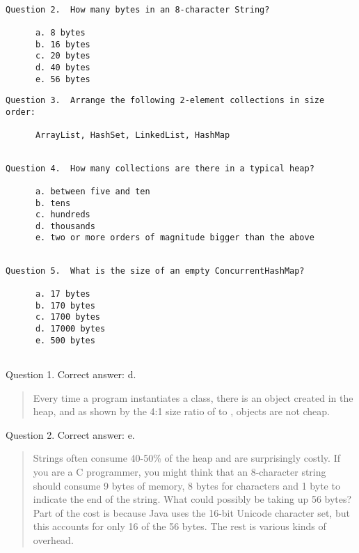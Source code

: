 \begin{verbatim}
   
Question 2.  How many bytes in an 8-character String?

      a. 8 bytes
      b. 16 bytes
      c. 20 bytes
      d. 40 bytes
      e. 56 bytes

\end{verbatim}

\begin{verbatim}             
Question 3.  Arrange the following 2-element collections in size order:
    
      ArrayList, HashSet, LinkedList, HashMap
      
\end{verbatim}

\begin{verbatim}      
Question 4.  How many collections are there in a typical heap?
   
      a. between five and ten
      b. tens
      c. hundreds
      d. thousands
      e. two or more orders of magnitude bigger than the above
      
\end{verbatim}

\begin{verbatim}
Question 5.  What is the size of an empty ConcurrentHashMap?
   
      a. 17 bytes
      b. 170 bytes
      c. 1700 bytes
      d. 17000 bytes
      e. 500 bytes
                 
\end{verbatim}

\newpage

Question 1.  Correct answer: d.

\begin{quote}
Every time
a program instantiates a class, there is an object created in the heap, and as
shown by the 4:1 size ratio of  to , objects are not
cheap.
\end{quote}

Question 2.  Correct answer: e.

\begin{quote}
Strings often consume 40-50\% of the heap and are
surprisingly costly. If you are a C programmer, you might think that an 8-character string should 
consume 9 bytes
of memory, 8 bytes for characters and 1 byte to indicate the end of the string.
What could possibly be taking up 56 bytes? Part of the cost is because Java uses
the 16-bit Unicode character set, but this accounts for only 16 of the 56 bytes.
The rest is various kinds of overhead.
\end{quote}

